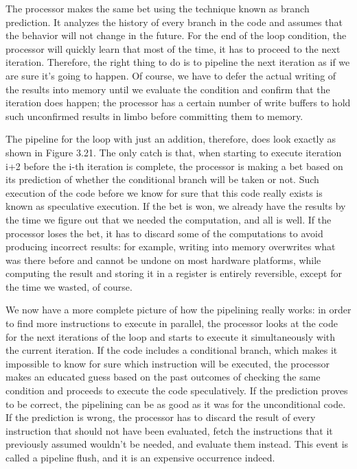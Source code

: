 The processor makes the same bet using the technique known as branch prediction. It analyzes the history of every branch in the code and assumes that the behavior will not change in the future. For the end of the loop condition, the processor will quickly learn that most of the time, it has to proceed to the next iteration. Therefore, the right thing to do is to pipeline the next iteration as if we are sure it's going to happen. Of course, we have to defer the actual writing of the results into memory until we evaluate the condition and confirm that the iteration does happen; the processor has a certain number of write buffers to hold such unconfirmed results in limbo before committing them to memory.

The pipeline for the loop with just an addition, therefore, does look exactly as shown in Figure 3.21. The only catch is that, when starting to execute iteration i+2 before the i-th iteration is complete, the processor is making a bet based on its prediction of whether the conditional branch will be taken or not. Such execution of the code before we know for sure that this code really exists is known as speculative execution. If the bet is won, we already have the results by the time we figure out that we needed the computation, and all is well. If the processor loses the bet, it has to discard some of the computations to avoid producing incorrect results: for example, writing into memory overwrites what was there before and cannot be undone on most hardware platforms, while computing the result and storing it in a register is entirely reversible, except for the time we wasted, of course.

We now have a more complete picture of how the pipelining really works: in order to find more instructions to execute in parallel, the processor looks at the code for the next iterations of the loop and starts to execute it simultaneously with the current iteration. If the code includes a conditional branch, which makes it impossible to know for sure which instruction will be executed, the processor makes an educated guess based on the past outcomes of checking the same condition and proceeds to execute the code speculatively. If the prediction proves to be correct, the pipelining can be as good as it was for the unconditional code. If the prediction is wrong, the processor has to discard the result of every instruction that should not have been evaluated, fetch the instructions that it previously assumed wouldn't be needed, and evaluate them instead. This event is called a pipeline flush, and it is an expensive occurrence indeed.

